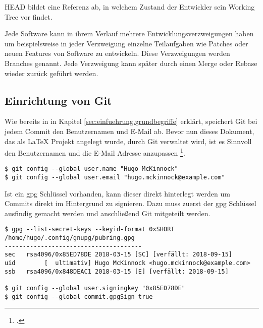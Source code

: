 HEAD bildet eine Referenz ab, in welchem Zustand der Entwickler sein Working Tree vor findet. 

Jede Software kann in ihrem Verlauf mehrere Entwicklungsverzweigungen haben um beispielsweise in jeder Verzweigung einzelne Teilaufgaben wie Patches oder neuen Features von Software zu entwickeln. Diese Verzweigungen werden Branches genannt. Jede Verzweigung kann später durch einen Merge oder Rebase wieder zurück geführt werden.


\label{sec:einfuehrung.git}
\subsection{Einrichtung von Git}
Wie bereits in in Kapitel \ref{sec:einfuehrung.grundbegriffe} erklärt, speichert Git bei jedem Commit den Benutzernamen und E-Mail ab. Bevor nun dieses Dokument, das als \LaTeX{} Projekt angelegt wurde, durch Git verwaltet wird, ist es Sinnvoll den Benutzernamen und die E-Mail Adresse anzupassen \footcite{git-1.6-your-identity}.

\begin{verbatim}
$ git config --global user.name "Hugo McKinnock"
$ git config --global user.email "hugo.mckinnock@example.com"
\end{verbatim}

Ist ein gpg Schlüssel vorhanden, kann dieser direkt hinterlegt werden um Commits direkt im Hintergrund zu signieren. Dazu muss zuerst der gpg Schlüssel ausfindig gemacht werden und anschließend Git mitgeteilt werden.

\begin{verbatim}
$ gpg --list-secret-keys --keyid-format 0xSHORT
/home/hugo/.config/gnupg/pubring.gpg
--------------------------------------
sec   rsa4096/0x85ED78DE 2018-03-15 [SC] [verfällt: 2018-09-15]
uid        [  ultimativ] Hugo McKinnock <hugo.mckinnock@example.com>
ssb   rsa4096/0x848DEAC1 2018-03-15 [E] [verfällt: 2018-09-15]

$ git config --global user.signingkey "0x85ED78DE"
$ git config --global commit.gpgSign true
\end{verbatim}